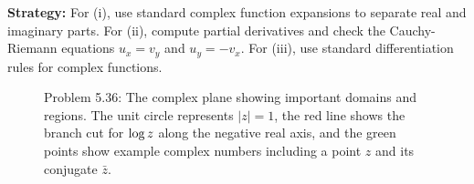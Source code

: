 \noindent\textbf{Strategy:} For (i), use standard complex function expansions to separate real and imaginary parts. For (ii), compute partial derivatives and check the Cauchy-Riemann equations \( u_x = v_y \) and \( u_y = -v_x \). For (iii), use standard differentiation rules for complex functions.

\begin{figure}[h]
\centering
{}
\caption{Problem 5.36: The complex plane showing important domains and regions. The unit circle represents $|z| = 1$, the red line shows the branch cut for $\log z$ along the negative real axis, and the green points show example complex numbers including a point $z$ and its conjugate $\bar{z}$.}
\end{figure}

